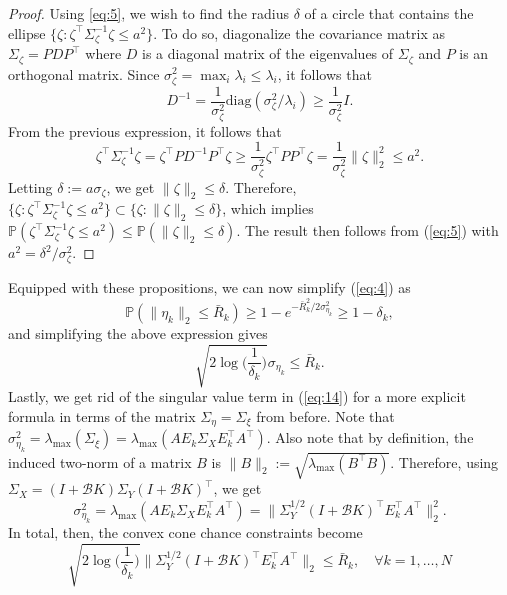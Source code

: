 \documentclass[12pt]{article}
\begin{document}
\begin{proof}
	Using \ref{eq:5}, we wish to find the radius $\delta$ of a circle that contains the ellipse $\{\zeta:\zeta^\intercal\Sigma_{\zeta}^{-1}\zeta \leq a^2\}$. 
	To do so, diagonalize the covariance matrix as $\Sigma_{\zeta} = PDP^\intercal$ where $D$ is a diagonal matrix of the eigenvalues of $\Sigma_{\zeta}$ and $P$ is an orthogonal matrix.
	Since $\sigma_{\zeta}^2 = \max_i\lambda_i \leq \lambda_i$, it follows that 
	\begin{equation}
	D^{-1} = \frac{1}{\sigma_{\zeta}^2}\text{diag}(\sigma_{\zeta}^2 / \lambda_i) \geq \frac{1}{\sigma_{\zeta}^2}I.
	\end{equation}
	From the previous expression, it follows that 
	\begin{equation}
	\zeta^\intercal \Sigma_{\zeta}^{-1} \zeta = \zeta^\intercal P D^{-1} P^\intercal \zeta \geq \frac{1}{\sigma_{\zeta}^2}\zeta^\intercal P P^\intercal \zeta = \frac{1}{\sigma_{\zeta}^2}\|\zeta\|_2^2 \leq a^2.
	\end{equation}
	Letting $\delta := a\sigma_{\zeta}$, we get $\|\zeta\|_2 \leq \delta$. Therefore, $\{\zeta: \zeta^\intercal \Sigma_{\zeta}^{-1}\zeta \leq a^2\} \subset \{\zeta: \|\zeta\|_2 \leq \delta\}$, which implies $\mathbb{P}(\zeta^\intercal \Sigma_{\zeta}^{-1}\zeta \leq a^2) \leq \mathbb{P}(\|\zeta\|_2 \leq \delta)$. The result then follows from (\ref{eq:5}) with $a^2 = \delta^2/\sigma_{\zeta}^2$.
\end{proof}

Equipped with these propositions, we can now simplify (\ref{eq:4}) as 
\begin{equation}
\mathbb{P}(\|\eta_k\|_2 \leq \bar{R}_k) \geq 1 - e^{-\bar{R}_k^2/2\sigma_{\eta_k}^2} \geq 1 - \delta_k, 
\end{equation}
and simplifying the above expression gives 
\begin{equation}\label{eq:14}
\sqrt{2\log\bigg(\frac{1}{\delta_k}\bigg)}\sigma_{\eta_k} \leq \bar{R}_k.
\end{equation}
Lastly, we get rid of the singular value term in (\ref{eq:14}) for a more explicit formula in terms of the matrix $\Sigma_{\eta} = \Sigma_{\xi}$ from before. Note that $\sigma_{\eta_k}^2 = \lambda_{\mathrm{max}}(\Sigma_{\xi}) = \lambda_{\mathrm{max}}(AE_k\Sigma_XE_k^\intercal A^\intercal)$. Also note that by definition, the induced two-norm of a matrix $B$ is $\|B\|_2 := \sqrt{\lambda_{\mathrm{max}}(B^\intercal B)}$. Therefore, using $\Sigma_X = (I + \mathcal{B}K)\Sigma_Y(I + \mathcal{B}K)^\intercal$, we get 
\begin{equation}
\sigma_{\eta_k}^2 = \lambda_{\mathrm{max}}(AE_k\Sigma_XE_k^\intercal A^\intercal) = \|\Sigma_Y^{1/2}(I + \mathcal{B}K)^\intercal E_k^\intercal A^\intercal\|_2^2.
\end{equation}
In total, then, the convex cone chance constraints become 
\begin{equation}\label{eq:16}
\boxed{\sqrt{2\log\bigg(\frac{1}{\delta_k}\bigg)}\|\Sigma_Y^{1/2}(I + \mathcal{B}K)^\intercal E_k^\intercal A^\intercal\|_2 \leq \bar{R}_k, \quad \forall k = 1,\ldots,N}
\end{equation}
\end{document}
